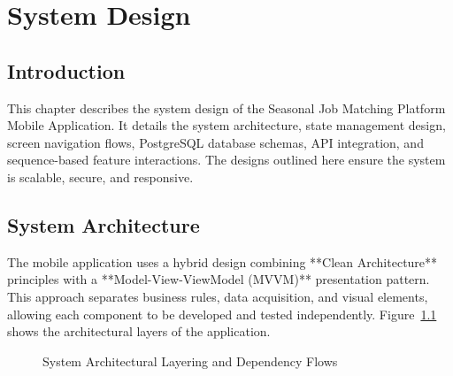 \chapter{System Design}
\label{ch:system_design}

\section{Introduction}
This chapter describes the system design of the Seasonal Job Matching Platform Mobile Application. It details the system architecture, state management design, screen navigation flows, PostgreSQL database schemas, API integration, and sequence-based feature interactions. The designs outlined here ensure the system is scalable, secure, and responsive.

\section{System Architecture}
The mobile application uses a hybrid design combining **Clean Architecture** principles with a **Model-View-ViewModel (MVVM)** presentation pattern. This approach separates business rules, data acquisition, and visual elements, allowing each component to be developed and tested independently. Figure~\ref{fig:architecture_layers} shows the architectural layers of the application.

\begin{figure}[htbp]
\centering
{}
\caption{System Architectural Layering and Dependency Flows}
\label{fig:architecture_layers}
\end{figure}

